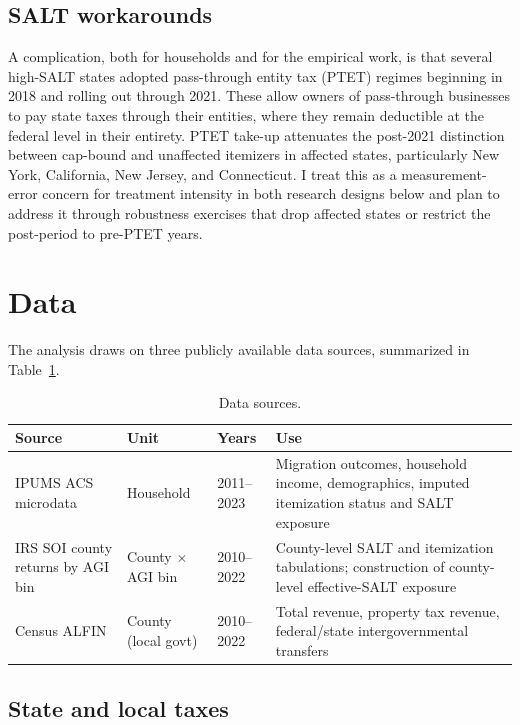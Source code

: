 \documentclass[12pt]{article}
\begin{document}
\subsection*{SALT workarounds}

A complication, both for households and for the empirical work, is that several high-SALT states adopted pass-through entity tax (PTET) regimes beginning in 2018 and rolling out through 2021. These allow owners of pass-through businesses to pay state taxes through their entities, where they remain deductible at the federal level in their entirety. PTET take-up attenuates the post-2021 distinction between cap-bound and unaffected itemizers in affected states, particularly New York, California, New Jersey, and Connecticut. I treat this as a measurement-error concern for treatment intensity in both research designs below and plan to address it through robustness exercises that drop affected states or restrict the post-period to pre-PTET years.


\section{Data}

The analysis draws on three publicly available data sources, summarized in Table~\ref{tab:data}.

\begin{table}[h!]
\centering
\small
\begin{tabular}{p{4.0cm} p{3.2cm} p{1.8cm} p{4.0cm}}
\toprule
Source & Unit & Years & Use \\
\midrule
IPUMS ACS microdata & Household & 2011--2023 & Migration outcomes, household income, demographics, imputed itemization status and SALT exposure \\
\addlinespace
IRS SOI county returns by AGI bin & County $\times$ AGI bin & 2010--2022 & County-level SALT and itemization tabulations; construction of county-level effective-SALT exposure \\
\addlinespace
Census ALFIN & County (local govt) & 2010--2022 & Total revenue, property tax revenue, federal/state intergovernmental transfers \\
\bottomrule
\end{tabular}
\caption{Data sources.}
\label{tab:data}
\end{table}

\subsection*{State and local taxes}
\end{document}
